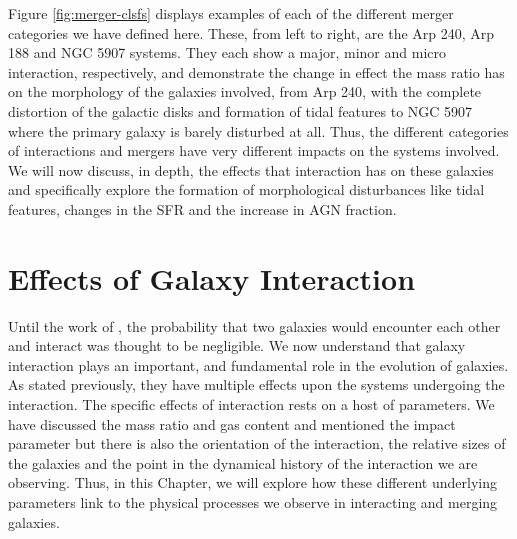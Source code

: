 Figure \ref{fig:merger-clsfs} displays examples of each of the different merger categories we have defined here. These, from left to right, are the Arp 240, Arp 188 and NGC 5907 systems. They each show a major, minor and micro interaction, respectively, and demonstrate the change in effect the mass ratio has on the morphology of the galaxies involved, from Arp 240, with the complete distortion of the galactic disks and formation of tidal features to NGC 5907 where the primary galaxy is barely disturbed at all. Thus, the different categories of interactions and mergers have very different impacts on the systems involved. We will now discuss, in depth, the effects that interaction has on these galaxies and specifically explore the formation of morphological disturbances like tidal features, changes in the SFR and the increase in AGN fraction.

\section{Effects of Galaxy Interaction}\label{sec:int_effects}
Until the work of \citet{1972ApJ...178..623T}, the probability that two galaxies would encounter each other and interact was thought to be negligible. We now understand that galaxy interaction plays an important, and fundamental role in the evolution of galaxies. As stated previously, they have multiple effects upon the systems undergoing the interaction. The specific effects of interaction rests on a host of parameters. We have discussed the mass ratio and gas content and mentioned the impact parameter but there is also the orientation of the interaction, the relative sizes of the galaxies and the point in the dynamical history of the interaction we are observing. Thus, in this Chapter, we will explore how these different underlying parameters link to the physical processes we observe in interacting and merging galaxies.

